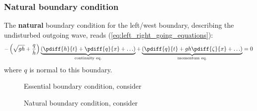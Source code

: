 \subsubsection{Natural boundary condition}
The \textbf{natural} boundary condition for the left/west boundary, describing the undisturbed outgoing wave, reads (\autoref{eq:left_right_going_equations}):
\begin{align}
    - \left(\sqrt{gh} + \frac{q}{h}\right) \underbrace{ \left(\pdiff{h}{t} + \pdiff{q}{x} + \ldots \right) }_{\text{continuity eq.}} + \underbrace{\left(\pdiff{q}{t} + g h \pdiff{\zeta}{x}+\ldots\right)}_{\text{momentum eq.}} = 0
\end{align}
where $q$ is normal to this boundary.
\newpage
\begin{figure}[H]
    \begin{center}
        \def\svgwidth{0.80\textwidth} %
        \resizebox{0.65\textwidth}{!}{
            
        }
    \end{center}
    \caption{Essential boundary condition, consider }
    \label{fig:structured_grid_along_straight_boundary_2}
\end{figure}
\begin{figure}[H]
    \begin{center}
        \def\svgwidth{0.80\textwidth} %
        \resizebox{0.65\textwidth}{!}{
            
        }
    \end{center}
    \caption{Natural boundary condition, consider }
    \label{fig:structured_grid_along_straight_boundary_2}
\end{figure}
